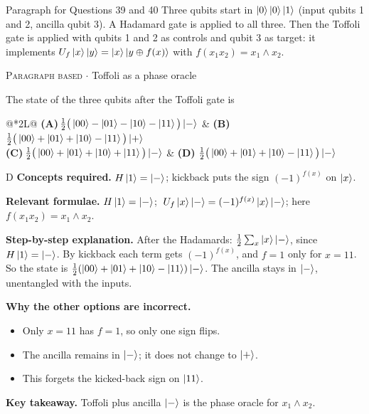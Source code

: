 \documentclass[11pt,a4paper]{article}
\newcommand{\optlabel}[1]{\textbf{(#1)}}
\newcommand{\correctlabel}[1]{\textcolor{okgreen}{\textbf{(#1)}\,\ding{51}}}
\newenvironment{qitem}[1]{\begin{list}{}{\setlength{\leftmargin}{3.3em}\setlength{\labelwidth}{3.1em}%
  \setlength{\labelsep}{0.2em}\setlength{\topsep}{3pt}\setlength{\parsep}{3pt}}\item[\textbf{Q.#1}\hfill]}{\end{list}}
\newcommand{\qsep}{\par\vspace{2pt}{\color{black!15}\hrule}\vspace{4pt}}
\newcommand{\qmeta}[2]{{\footnotesize\color{black!60}\textsc{#1} \;$\cdot$\; #2}\par}
\begin{document}
\begin{passagebox}{Paragraph for Questions 39 and 40}
Three qubits start in $\ket{0}\ket{0}\ket{1}$ (input qubits 1 and 2, ancilla qubit 3). A Hadamard gate is applied to all three. Then the
Toffoli gate is applied with qubits 1 and 2 as controls and qubit 3 as target: it implements
$U_f\ket{x}\ket{y} = \ket{x}\ket{y \oplus f(x)}$ with $f(x_1x_2) = x_1 \land x_2$.
\end{passagebox}
\begin{qitem}{39}
\qmeta{Paragraph based}{Toffoli as a phase oracle}
The state of the three qubits after the Toffoli gate is
\par\smallskip\noindent\begin{tabularx}{\linewidth}{@{}*{2}{L}@{}}
\optlabel{A}\,$\frac12\big(\ket{00} - \ket{01} - \ket{10} - \ket{11}\big)\ket{-}$ & \optlabel{B}\,$\frac12\big(\ket{00} + \ket{01} + \ket{10} - \ket{11}\big)\ket{+}$ \\[3pt]
\optlabel{C}\,$\frac12\big(\ket{00} + \ket{01} + \ket{10} + \ket{11}\big)\ket{-}$ & \correctlabel{D}\,$\frac12\big(\ket{00} + \ket{01} + \ket{10} - \ket{11}\big)\ket{-}$
\end{tabularx}
\end{qitem}
\begin{solbox}{D}
\textbf{\color{brand}Concepts required.} $H\ket1 = \ket{-}$; kickback puts the sign $(-1)^{f(x)}$ on $\ket{x}$.

\textbf{\color{brand}Relevant formulae.} $H\ket1 = \ket{-}$; $\;U_f\ket{x}\ket{-} = (-1)^{f(x)}\ket{x}\ket{-}$; here $f(x_1x_2) = x_1\land x_2$.

\textbf{\color{brand}Step-by-step explanation.} After the Hadamards: $\frac12\sum_x\ket{x}\ket{-}$, since $H\ket1 = \ket{-}$. By kickback each term gets $(-1)^{f(x)}$, and $f = 1$ only for $x = 11$.
So the state is $\frac12(\ket{00} + \ket{01} + \ket{10} - \ket{11})\ket{-}$. The ancilla stays in $\ket{-}$, unentangled with the inputs.

\textbf{\color{brand}Why the other options are incorrect.}
\begin{itemize}[leftmargin=2.4em, itemsep=1pt, topsep=2pt]
\item[\textbf{(A)}] Only $x = 11$ has $f = 1$, so only one sign flips.
\item[\textbf{(B)}] The ancilla remains in $\ket{-}$; it does not change to $\ket{+}$.
\item[\textbf{(C)}] This forgets the kicked-back sign on $\ket{11}$.
\end{itemize}
\textbf{\color{brand}Key takeaway.} Toffoli plus ancilla $\ket{-}$ is the phase oracle for $x_1 \land x_2$.
\end{solbox}
\qsep
\end{document}
